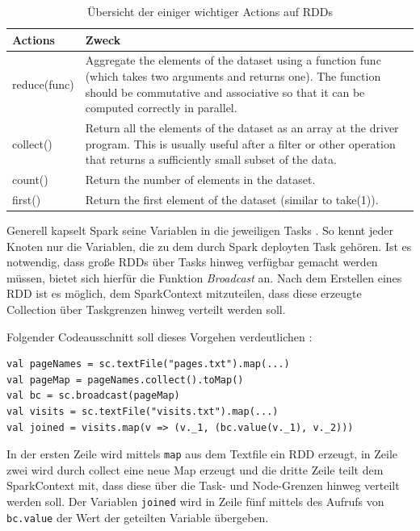\begin{table}[!ht]
\centering
\begin{tabular}{| p{5cm} | p{8cm} | }
\hline
Actions & Zweck \\ \hline \hline
reduce(func) & Aggregate the elements of the dataset using a function func (which takes two arguments and returns one). The function should be commutative and associative so that it can be computed correctly in parallel.  \\ \hline 
collect() & Return all the elements of the dataset as an array at the driver program. This is usually useful after a filter or other operation that returns a sufficiently small subset of the data. \\ \hline 
count() & Return the number of elements in the dataset. \\ \hline 
first() & Return the first element of the dataset (similar to take(1)). \\ \hline 
\end{tabular}
\caption{Übersicht der einiger wichtiger Actions auf RDDs}
	\label{tab:actions}
\end{table}



Generell kapselt Spark seine Variablen in die jeweiligen Tasks . So kennt jeder Knoten nur die Variablen, die zu dem durch Spark deployten Task gehören. Ist es notwendig, dass große RDDs über Tasks hinweg verfügbar gemacht werden müssen, bietet sich hierfür die Funktion \textit{Broadcast} an. Nach dem Erstellen eines RDD ist es möglich, dem SparkContext mitzuteilen, dass diese erzeugte Collection über Taskgrenzen hinweg verteilt werden soll. 

Folgender Codeausschnitt soll dieses Vorgehen verdeutlichen : 

\begin{lstlisting}[label=broadcast,caption=Verwendung der Broadcast-Variablen in Spark]
val pageNames = sc.textFile("pages.txt").map(...)
val pageMap = pageNames.collect().toMap()
val bc = sc.broadcast(pageMap)
val visits = sc.textFile("visits.txt").map(...)
val joined = visits.map(v => (v._1, (bc.value(v._1), v._2)))
\end{lstlisting}

In der ersten Zeile wird mittels \texttt{map} aus dem Textfile ein RDD erzeugt, in Zeile zwei wird durch collect eine neue Map erzeugt und die dritte Zeile teilt dem SparkContext mit, dass diese über die Task- und Node-Grenzen hinweg verteilt werden soll. Der Variablen \texttt{joined} wird in Zeile fünf mittels des Aufrufs von \texttt{bc.value} der Wert der geteilten Variable übergeben.



